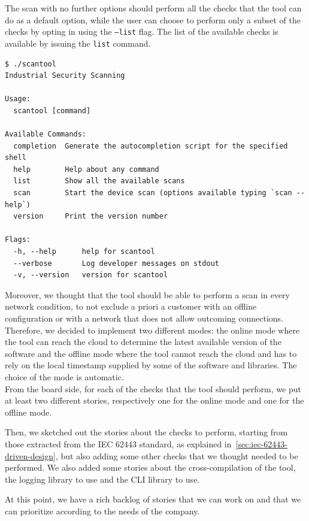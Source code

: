 The scan with no further options should perform all the checks that the tool can do as a default option, while the user can choose to perform only a subset of the checks by opting in using the \texttt{--list} flag. The list of the available checks is available by issuing the \texttt{list} command.

\begin{lstlisting}[caption={Man page}]
$ ./scantool
Industrial Security Scanning

Usage:
  scantool [command]

Available Commands:
  completion  Generate the autocompletion script for the specified shell
  help        Help about any command
  list        Show all the available scans
  scan        Start the device scan (options available typing `scan --help`)
  version     Print the version number

Flags:
  -h, --help      help for scantool
  --verbose       Log developer messages on stdout
  -v, --version   version for scantool
\end{lstlisting}

Moreover, we thought that the tool should be able to perform a scan in every network condition, to not exclude a priori a customer with an offline configuration or with a network that does not allow outcoming connections. Therefore, we decided to implement two different modes: the online mode where the tool can reach the cloud to determine the latest available version of the software and the offline mode where the tool cannot reach the cloud and has to rely on the local timestamp supplied by some of the software and libraries. The choice of the mode is automatic. \\
From the board side, for each of the checks that the tool should perform, we put at least two different stories, respectively one for the online mode and one for the offline mode.

Then, we sketched out the stories about the checks to perform, starting from those extracted from the IEC 62443 standard, as explained in~\cref{sec:iec-62443-driven-design}, but also adding some other checks that we thought needed to be performed. We also added some stories about the cross-compilation of the tool, the logging library to use and the CLI library to use.

At this point, we have a rich backlog of stories that we can work on and that we can prioritize according to the needs of the company.

